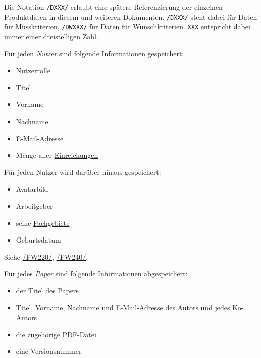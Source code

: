 
Die Notation \texttt{/DXXX/} erlaubt eine spätere Referenzierung der einzelnen Produktdaten in diesem und weiteren
Dokumenten. \texttt{/DXXX/} steht dabei für Daten für Musskriterien, \texttt{/DWXXX/} für Daten für Wunschkriterien. \texttt{XXX} entspricht dabei immer einer dreistelligen Zahl.

\begin{description}

	 Für jeden \emph{Nutzer} sind folgende Informationen gespeichert:
	\begin{itemize}
		\item \hyperref[produktfunktionen]{Nutzerrolle}
		\item Titel
		\item Vorname
		\item Nachname
		\item E-Mail-Adresse
		\item Menge aller \hyperref[d025]{Einreichungen}
	\end{itemize}

	 Für jeden Nutzer wird darüber hinaus gespeichert:
	\begin{itemize}
		\item Avatarbild
		\item Arbeitgeber
		\item seine \hyperref[d035]{Fachgebiete}
		\item Geburtsdatum
	\end{itemize}
	Siehe \hyperref[funkt:220]{/FW220/}, \hyperref[funkt:240]{/FW240/}.

	 Für jedes \emph{Paper} sind folgende Informationen abgespeichert:
	\begin{itemize}
		\item der Titel des Papers
		\item Titel, Vorname, Nachname und E-Mail-Adresse des Autors und jedes Ko-Autors
		\item die zugehörige PDF-Datei
		\item eine Versionsnummer
	\end{itemize}


\end{description}
